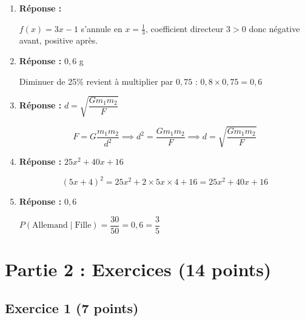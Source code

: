 \documentclass[a4paper,12pt]{article}
\begin{document}
\begin{enumerate}
\item \textbf{Réponse :} 

\(f(x) = 3x - 1\) s'annule en \(x = \frac{1}{3}\), coefficient directeur \(3 > 0\) donc négative avant, positive après.

\item \textbf{Réponse :}  \(0,6\) g

Diminuer de 25\% revient à multiplier par \(0,75\) : \(0,8 \times 0,75 = 0,6\)

\item \textbf{Réponse :}  \(d = \sqrt{\dfrac{G m_1 m_2}{F}}\)

\[
F = G\frac{m_1 m_2}{d^2} \implies d^2 = \frac{G m_1 m_2}{F} \implies d = \sqrt{\frac{G m_1 m_2}{F}}
\]

\item \textbf{Réponse :}  \(25x^2 + 40x + 16\)

\[
(5x+4)^2 = 25x^2 + 2 \times 5x \times 4 + 16 = 25x^2 + 40x + 16
\]

\item \textbf{Réponse :}  \(0,6\)

\(P(\text{Allemand} \mid \text{Fille}) = \dfrac{30}{50} = 0,6 = \dfrac{3}{5}\)

\end{enumerate}

\section*{Partie 2 : Exercices (14 points)}

\subsection*{Exercice 1 (7 points)}
\end{document}
